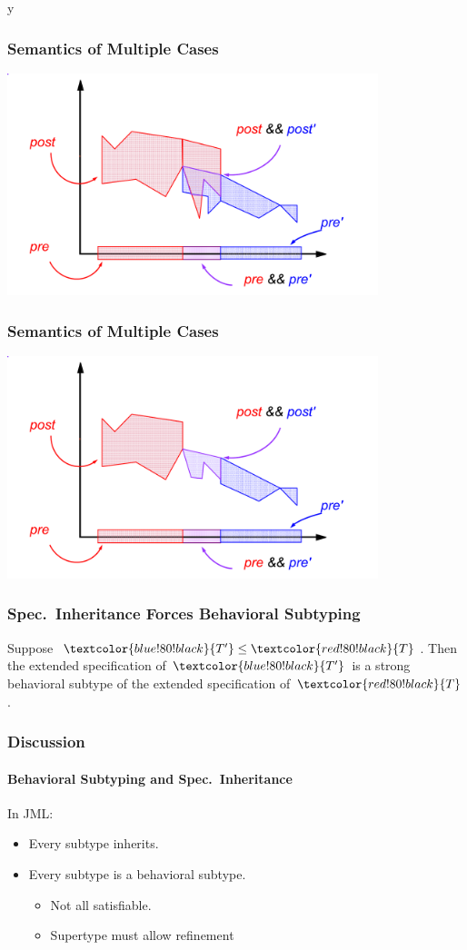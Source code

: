 \if y\MAKEHANDOUTS \documentclass[t,compress,landscape,handout]{beamer}
\newcommand{\STO}{\ensuremath{\leq}}
\newcommand{\RED}[1]{\textcolor{red!80!black}{#1}}
\newcommand{\BLUE}[1]{\textcolor{blue!80!black}{#1}}
\newcommand{\REDT}{\RED{\ensuremath{T}}}
\newcommand{\BLUETP}{\BLUE{\ensuremath{T'}}}
\begin{document}
\begin{frame}
\frametitle{Semantics of Multiple Cases}
\transdissolve[duration=0.5]
\includegraphics[width=4.25in]{join-both}
\end{frame}

\begin{frame}
\frametitle{Semantics of Multiple Cases}
\includegraphics[width=4.25in]{join-intersect}
\end{frame}

\begin{frame}
\frametitle{Spec.~Inheritance Forces Behavioral Subtyping}
\begin{theorem}
Suppose $\BLUETP \STO \REDT$.
Then the extended specification of $\BLUETP$
is a strong behavioral subtype of
the extended specification of $\REDT$.
\end{theorem}
\end{frame}

\begin{frame}
\frametitle{Discussion}
\framesubtitle{Behavioral Subtyping and Spec.~Inheritance}

In JML:
\begin{itemize}
\item
Every subtype inherits.

\item
Every subtype is a behavioral subtype.
\begin{itemize}
\item
Not all satisfiable.

\item
Supertype must allow refinement
\end{itemize}
\end{itemize}
\end{frame}
\end{document}
